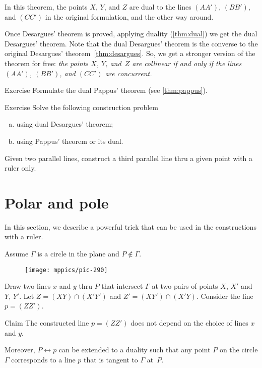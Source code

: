 In this theorem, the points $X$, $Y$, and $Z$ 
are dual to the lines $(AA')$, $(BB')$, and $(CC')$ in the original formulation, and the other way around.

Once Desargues' theorem is proved, applying duality (\ref{thm:dual})
we get the dual Desargues' theorem.
Note that the dual Desargues' theorem is the converse to the original Desargues' theorem~\ref{thm:desargues}.
So, we get a stronger version of the theorem for free: \textit{the points $X$, $Y$, and~$Z$ are collinear {}\emph{if and only if} the lines  $(AA')$, $(BB')$, and $(CC')$ are concurrent.}

\begin{thm}{Exercise}\label{ex:dual-pappus}
Formulate the dual Pappus' theorem (see \ref{thm:pappus}).
\end{thm}

\begin{thm}{Exercise}\label{ex:dual-desargues-construction} 
Solve the following construction problem
\begin{enumerate}[(a)]
\item\label{ex:dual-desargues-construction:desargues} using dual Desargues' theorem;
\item\label{ex:dual-desargues-construction:pappus} using Pappus' theorem or its dual.
\end{enumerate}
Given two parallel lines, construct a third parallel line thru a given point with a ruler only.
\end{thm}

\section{Polar and pole}

In this section, we describe a powerful trick that can be used in the constructions with a ruler.

Assume $\Gamma$ is a circle in the plane and $P\notin \Gamma$.
\begin{figure}[!ht]
\centering
\texttt{[image: mppics/pic-290]}
\end{figure}
Draw two lines $x$ and $y$ thru $P$ that intersect $\Gamma$ at two pairs of points $X$, $X'$ and $Y$, $Y'$.
Let $Z=(XY)\cap(X'Y')$ and $Z'=(XY')\cap(X'Y)$.
Consider the line $p=(ZZ')$.

\begin{thm}{Claim}\label{clm:polar}
The constructed line $p=(ZZ')$ does not depend on the choice of lines $x$ and $y$.

Moreover, $P\leftrightarrow p$ can be extended to a duality such that any point $P$ on the circle $\Gamma$ corresponds to a line $p$ that is tangent to $\Gamma$ at~$P$. 
\end{thm}

